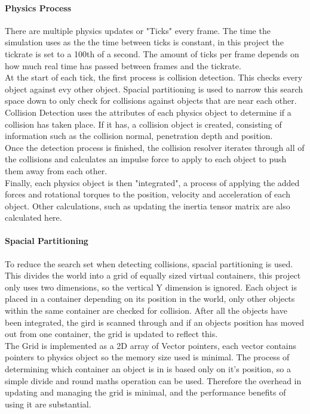 \documentclass[conference]{acmsiggraph}
\begin{document}
\paragraph{Physics Process}
There are multiple physics updates or "Ticks" every frame. The time the simulation uses as the the time between ticks is constant, in this project the tickrate	is set to a 100th of a second. The amount of ticks per frame depends on how much real time has passed between frames and the tickrate.\\	
At the start of each tick, the first process is collision detection. This checks every object against evy other object. Spacial partitioning is used to narrow this search space down to only check for collisions against objects that are near each other.
\\
Collision Detection uses the attributes of each physics object to determine if a collision has taken place. If it has, a collision object is created, consisting of information such as the collision normal, penetration depth and position.
\\
Once the detection process is finished, the collision resolver iterates through all of the collisions and calculates an impulse force to apply to each object to push them away from each other.
\\
Finally, each physics object is then "integrated", a process of applying the added forces and rotational torques to the position, velocity and acceleration of each object. Other calculations, such as updating the inertia tensor matrix are also calculated here.

\paragraph{Spacial Partitioning}
To reduce the search set when detecting collisions, spacial partitioning is used. This divides the world into a grid of equally sized virtual containers, this project only uses two dimensions, so the vertical Y dimension is ignored. Each object is placed in a container depending on its position in the world, only other objects within the same container are checked for collision. After all the objects have been integrated, the gird is scanned through and if an objects position has moved out from one container, the grid is updated to reflect this.
\\
The Grid is implemented as a 2D array of Vector pointers, each vector contains pointers to physics object so the memory size used is minimal. The process of determining which container an object is in is based only on it's position, so a simple divide and round maths operation can be used. Therefore the overhead in updating and managing the grid is minimal, and the performance benefits of using it are substantial.
	
\end{document}
